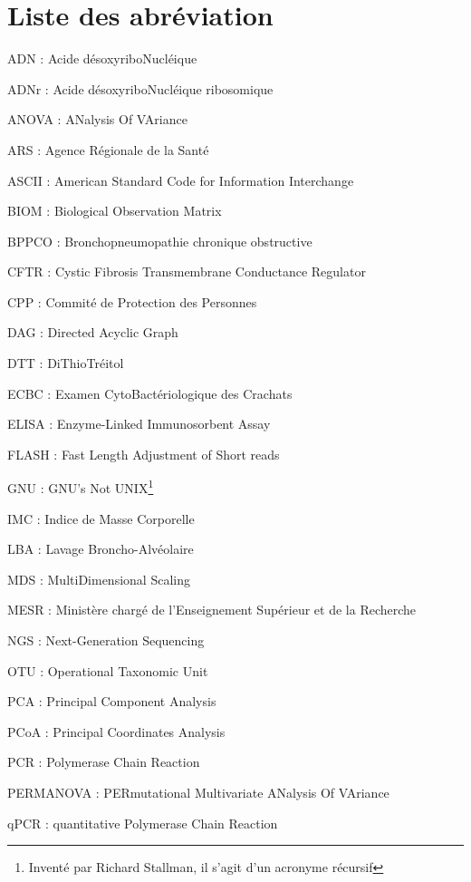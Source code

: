 \documentclass[12pt,a4paper]{article}
\begin{document}
\section*{Liste des abréviation}

\begin{description}[leftmargin=*]
\item ADN : Acide désoxyriboNucléique
\item ADNr : Acide désoxyriboNucléique ribosomique
\item ANOVA : ANalysis Of VAriance
\item ARS : Agence Régionale de la Santé
\item ASCII : American Standard Code for Information Interchange
\item BIOM :  Biological Observation Matrix
\item BPPCO : Bronchopneumopathie chronique obstructive
\item CFTR : Cystic Fibrosis Transmembrane Conductance Regulator
\item CPP : Commité de Protection des Personnes
\item DAG : Directed Acyclic Graph
\item DTT : DiThioTréitol
\item ECBC : Examen CytoBactériologique des Crachats
\item ELISA : Enzyme-Linked Immunosorbent Assay
\item FLASH : Fast Length Adjustment of Short reads
\item GNU : GNU’s Not UNIX\footnote{Inventé par Richard Stallman, il s'agit d'un acronyme récursif}
\item IMC : Indice de Masse Corporelle
\item LBA :  Lavage Broncho-Alvéolaire
\item MDS : MultiDimensional Scaling
\item MESR : Ministère chargé de l'Enseignement Supérieur et de la Recherche
\item NGS : Next-Generation Sequencing
\item OTU : Operational Taxonomic Unit
\item PCA : Principal Component Analysis
\item PCoA : Principal Coordinates Analysis
\item PCR : Polymerase Chain Reaction
\item PERMANOVA : PERmutational Multivariate ANalysis Of VAriance
\item qPCR : quantitative Polymerase Chain Reaction

\end{description}
\end{document}
